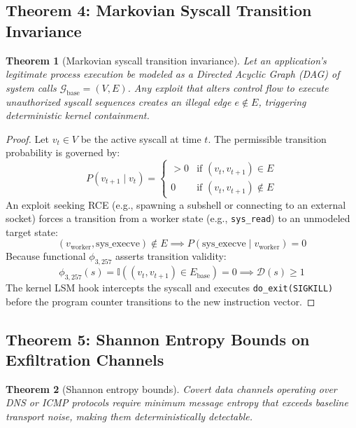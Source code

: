 \documentclass{portalciencia}
\theoremstyle{plain}
\newtheorem{theorem}{Theorem}
\theoremstyle{definition}
\begin{document}
\subsection{Theorem 4: Markovian Syscall Transition Invariance}

\begin{theorem}[Markovian syscall transition invariance]
Let an application's legitimate process execution be modeled as a Directed Acyclic Graph (DAG) of system calls $\mathcal{G}_{\mathrm{base}} = (V, E)$. Any exploit that alters control flow to execute unauthorized syscall sequences creates an illegal edge $e \notin E$, triggering deterministic kernel containment.
\end{theorem}

\begin{proof}
Let $v_{t} \in V$ be the active syscall at time $t$. The permissible transition probability is governed by:
\begin{equation}
\label{eq:markov}
P(v_{t+1} \mid v_{t}) = \begin{cases}
> 0 & \text{if } (v_{t}, v_{t+1}) \in E \\
0 & \text{if } (v_{t}, v_{t+1}) \notin E
\end{cases}
\end{equation}
An exploit seeking RCE (e.g., spawning a subshell or connecting to an external socket) forces a transition from a worker state (e.g., \texttt{sys\_read}) to an unmodeled target state:
\begin{equation}
\label{eq:execve}
(v_{\mathrm{worker}}, \mathrm{sys\_execve}) \notin E \implies P(\mathrm{sys\_execve} \mid v_{\mathrm{worker}}) = 0
\end{equation}
Because functional $\phi_{3,257}$ asserts transition validity:
\begin{equation}
\label{eq:phi257}
\phi_{3,257}(s) = \mathbb{I}\left( (v_{t}, v_{t+1}) \in E_{\mathrm{base}} \right) = 0 \implies \mathcal{D}(s) \ge 1
\end{equation}
The kernel LSM hook intercepts the syscall and executes \texttt{do\_exit(SIGKILL)} before the program counter transitions to the new instruction vector.
\end{proof}

\subsection{Theorem 5: Shannon Entropy Bounds on Exfiltration Channels}

\begin{theorem}[Shannon entropy bounds]
Covert data channels operating over DNS or ICMP protocols require minimum message entropy that exceeds baseline transport noise, making them deterministically detectable.
\end{theorem}
\end{document}
